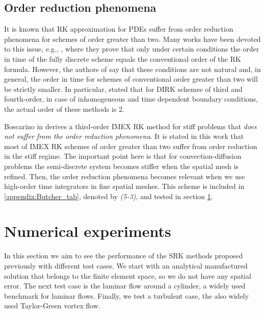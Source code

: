 \subsection{Order reduction phenomena}
\label{subsec-C6_order_reduction}
It is known that RK approximation for PDEs suffer from order reduction phenomena for schemes of order greater than two. Many works have been devoted to this issue, e.g., \cite{sanz-serna_convergence_1986,verwer_j._g._convergence_1986}, where they prove that only under certain conditions the order in time of the fully discrete scheme equals the conventional order of the RK formula. However, the authors of \cite{sanz-serna_convergence_1986,verwer_j._g._convergence_1986} say that these conditions are not natural and, in general, the order in time for schemes of conventional order greater than two will be strictly smaller. In particular, \cite{verwer_j._g._convergence_1986} stated that for DIRK schemes of third and fourth-order, in case of inhomogeneous and time dependent boundary conditions, the actual order of these methods is 2.

Boscarino in \cite{boscarino_accurate_2009} derives a third-order IMEX RK method for stiff problems that \emph{does not suffer from the order reduction phenomena}. It is stated in this work that most of IMEX RK schemes of order greater than two suffer from order reduction in the stiff regime. The important point here is that for convection-diffusion problems the semi-discrete system becomes stiffer when the spatial mesh is refined. Then, the order reduction phenomena becomes relevant when we use high-order time integrators in fine spatial meshes. This scheme is included in \ref{appendix:Butcher_tab}, denoted by \textit{(5-3)}, and tested in section \ref{sec-C6_experiments}.



\section{Numerical experiments}
\label{sec-C6_experiments}
In this section we aim to see the performance of the SRK methods proposed previously with different test cases. We start with an analytical manufactured solution that belongs to the finite element space, so we do not have any spatial error. The next test case is the laminar flow around a cylinder, a widely used benchmark for laminar flows. Finally, we test a turbulent case, the also widely used Taylor-Green vortex flow.

